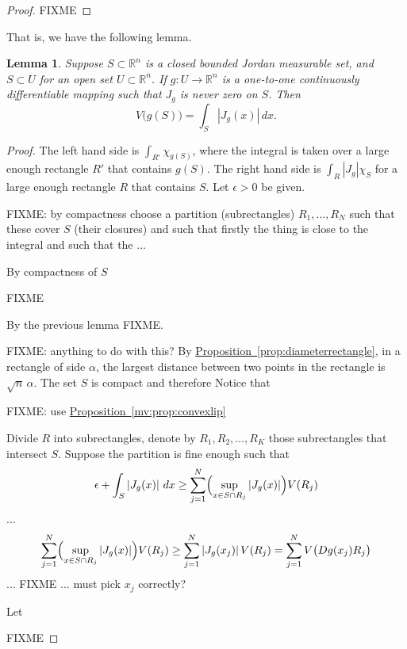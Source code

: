 \documentclass[12pt]{book}
\newcommand{\abs}[1]{\left\lvert {#1} \right\rvert}
\newcommand{\R}{{\mathbb{R}}}
\theoremstyle{plain}
\newtheorem{lemma}[thm]{Lemma}
\theoremstyle{remark}
\theoremstyle{definition}
\theoremstyle{exercise}
\theoremstyle{example}
\newcommand{\propref}[1]{\hyperref[#1]{Proposition~\ref*{#1}}}
\begin{document}
\begin{proof}
FIXME
\end{proof}


  That is, we have
the following lemma.

\begin{lemma}
Suppose $S \subset \R^n$ is a closed bounded Jordan measurable set,
and $S \subset U$ for an open set $U \subset \R^n$.  If
$g \colon U \to \R^n$ is a one-to-one
continuously differentiable mapping such that
$J_g$ is never zero on $S$.
Then
\begin{equation*}
V\bigl(g(S)\bigr)
=
\int_S \abs{J_g(x)} \, dx .
\end{equation*}
\end{lemma}

\begin{proof}
The left hand side is $\int_{R'} \chi_{g(S)}$, where the integral is taken over a
large enough rectangle $R'$ that contains $g(S)$.
The right hand side is $\int_{R} \abs{J_g} \chi_S$ for
a large enough rectangle $R$ that contains $S$.  Let $\epsilon > 0$ be
given.


FIXME: by compactness choose a partition (subrectangles) $R_1,\ldots,R_N$ such that these cover $S$
(their closures) and such that firstly  the thing is close to the integral
and such that the ...


By compactness of $S$

FIXME

By the previous lemma FIXME.




FIXME: anything to do with this?
By \propref{prop:diameterrectangle},
in a rectangle of side $\alpha$, the largest distance 
between two points in the rectangle is $\sqrt{n} \, \alpha$.
The set $S$ is compact and therefore 
Notice that 

FIXME: use
\propref{mv:prop:convexlip}





Divide $R$ into
subrectangles, denote
by $R_1,R_2,\ldots,R_K$ those subrectangles that intersect $S$.
Suppose the partition is fine enough such that
\begin{equation*}
\epsilon + \int_S \abs{J_g(x)} \, dx \geq
\sum_{j=1}^N \Bigl(\sup_{x \in S \cap R_j} \abs{J_g(x)} \Bigr) V(R_j)
\end{equation*}
...
\begin{equation*}
\sum_{j=1}^N \Bigl(\sup_{x \in S \cap R_j} \abs{J_g(x)} \Bigr) V(R_j)
\geq
\sum_{j=1}^N \abs{J_g(x_j)}  V(R_j)
=
\sum_{j=1}^N V\bigl(Dg(x_j) R_j\bigr)
\end{equation*}
... FIXME ... must pick $x_j$ correctly?




Let 






FIXME
\end{proof}
\end{document}
